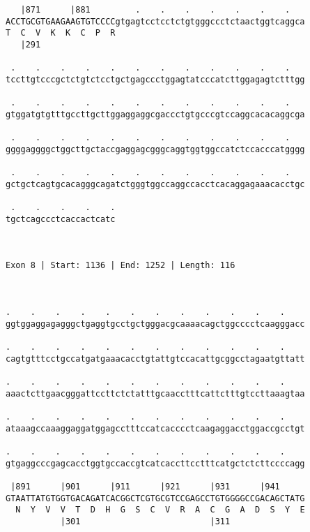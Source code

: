\documentclass{article}
\begin{document}
\begin{Verbatim}
   |871      |881         .    .    .    .    .    .    .   
ACCTGCGTGAAGAAGTGTCCCCgtgagtcctcctctgtgggccctctaactggtcaggca
T  C  V  K  K  C  P  R                                      
   |291                                                     
  
 .    .    .    .    .    .    .    .    .    .    .    .   
tccttgtcccgctctgtctcctgctgagccctggagtatcccatcttggagagtctttgg
                                                            
 .    .    .    .    .    .    .    .    .    .    .    .   
gtggatgtgtttgccttgcttggaggaggcgaccctgtgcccgtccaggcacacaggcga
                                                            
 .    .    .    .    .    .    .    .    .    .    .    .   
ggggaggggctggcttgctaccgaggagcgggcaggtggtggccatctccacccatgggg
                                                            
 .    .    .    .    .    .    .    .    .    .    .    .   
gctgctcagtgcacagggcagatctgggtggccaggccacctcacaggagaaacacctgc
                                                            
 .    .    .    .    .
tgctcagccctcaccactcatc
                      
                      
 
Exon 8 | Start: 1136 | End: 1252 | Length: 116



.    .    .    .    .    .    .    .    .    .    .    .    
ggtggaggagagggctgaggtgcctgctgggacgcaaaacagctggcccctcaagggacc
                                                            
.    .    .    .    .    .    .    .    .    .    .    .    
cagtgtttcctgccatgatgaaacacctgtattgtccacattgcggcctagaatgttatt
                                                            
.    .    .    .    .    .    .    .    .    .    .    .    
aaactcttgaacgggattccttctctatttgcaacctttcattctttgtccttaaagtaa
                                                            
.    .    .    .    .    .    .    .    .    .    .    .    
ataaagccaaaggaggatggagcctttccatcacccctcaagaggacctggaccgcctgt
                                                            
.    .    .    .    .    .    .    .    .    .    .    .    
gtgaggcccgagcacctggtgccaccgtcatcaccttcctttcatgctctcttccccagg
                                                            
 |891      |901      |911      |921      |931      |941     
GTAATTATGTGGTGACAGATCACGGCTCGTGCGTCCGAGCCTGTGGGGCCGACAGCTATG
  N  Y  V  V  T  D  H  G  S  C  V  R  A  C  G  A  D  S  Y  E
           |301                          |311               
  

\end{Verbatim}
\end{document}
